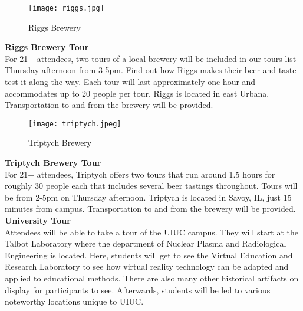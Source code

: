 \setlength\intextsep{0pt}
\begin{wrapfigure}{L}{0.3\textwidth}
	\begin{center}
		\texttt{[image: riggs.jpg]}
		\caption{Riggs Brewery}
	\end{center}
\end{wrapfigure}

\textbf{Riggs Brewery Tour}\\
For 21+ attendees, two tours of a local brewery will be included in our tours list Thursday afternoon from 3-5pm. Find out how Riggs makes their beer and taste test it along the way. Each tour will last approximately one hour and accommodates up to 20 people per tour. Riggs is located in east Urbana. Transportation to and from the brewery will be provided. \\ 
\setlength\intextsep{0pt}
\begin{wrapfigure}{R}{0.3\textwidth}
	\begin{center}
		\texttt{[image: triptych.jpeg]}
		\caption{Triptych Brewery}
	\end{center}
\end{wrapfigure}
\newline
\vspace{1cm}
\newline


\textbf{Triptych Brewery Tour}\\
For 21+ attendees, Triptych offers two tours that run around 1.5 hours for roughly 30 people each that includes several beer tastings throughout. Tours will be from 2-5pm on Thursday afternoon. Triptych is located in Savoy, IL, just 15 minutes from campus. Transportation to and from the brewery will be provided.\\
\newline
\vspace{2cm}
\newline
\textbf{University Tour}\\
Attendees will be able to take a tour of the UIUC campus. They will start at the Talbot Laboratory where the department of Nuclear Plasma and Radiological Engineering is located. Here, students will get to see the Virtual Education and Research Laboratory to see how virtual reality technology can be adapted and applied to educational methods. There are also many other historical artifacts on display for participants to see. Afterwards, students will be led to various noteworthy locations unique to UIUC.\\ 	


